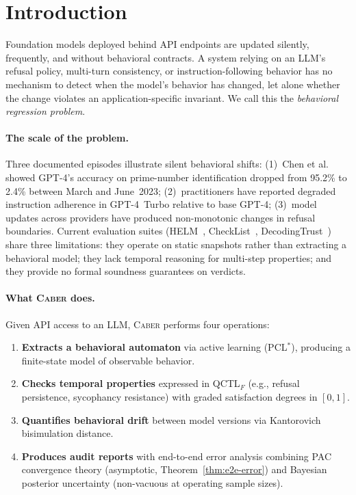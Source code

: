 \documentclass[11pt]{article}
\newcommand{\tool}{\textsc{Caber}}
\newcommand{\pclstar}{PCL$^*$}
\newcommand{\qctlf}{QCTL$_F$}
\begin{document}
\section{Introduction}\label{sec:intro}

Foundation models deployed behind API endpoints are updated silently,
frequently, and without behavioral contracts.  A system relying on
an LLM's refusal policy, multi-turn consistency, or instruction-following
behavior has no mechanism to detect when the model's behavior has changed,
let alone whether the change violates an application-specific invariant.
We call this the \emph{behavioral regression problem}.

\paragraph{The scale of the problem.}
Three documented episodes illustrate silent behavioral shifts:
(1)~Chen et al.~\cite{chen2023chatgpt} showed GPT-4's accuracy on
prime-number identification dropped from 95.2\% to 2.4\% between
March and June~2023;
(2)~practitioners have reported degraded instruction adherence
in GPT-4~Turbo relative to base GPT-4;
(3)~model updates across providers have produced non-monotonic
changes in refusal boundaries.
Current evaluation suites
(HELM~\cite{liang2023helm},
CheckList~\cite{ribeiro2020beyond},
DecodingTrust~\cite{wang2023decodingtrust})
share three limitations:
they operate on static snapshots rather than extracting a behavioral
model; they lack temporal reasoning for multi-step properties;
and they provide no formal soundness guarantees on verdicts.

\paragraph{What \tool{} does.}
Given API access to an LLM, \tool{} performs four operations:
\begin{enumerate}[leftmargin=*,nosep]
\item \textbf{Extracts a behavioral automaton} via active learning
  (\pclstar{}), producing a finite-state model of observable behavior.
\item \textbf{Checks temporal properties} expressed in \qctlf{}
  (e.g., refusal persistence, sycophancy resistance) with graded
  satisfaction degrees in $[0,1]$.
\item \textbf{Quantifies behavioral drift} between model versions
  via Kantorovich bisimulation distance.
\item \textbf{Produces audit reports} with end-to-end error
  analysis combining PAC convergence theory (asymptotic,
  Theorem~\ref{thm:e2e-error}) and Bayesian posterior
  uncertainty (non-vacuous at operating sample sizes).
\end{enumerate}
\end{document}
